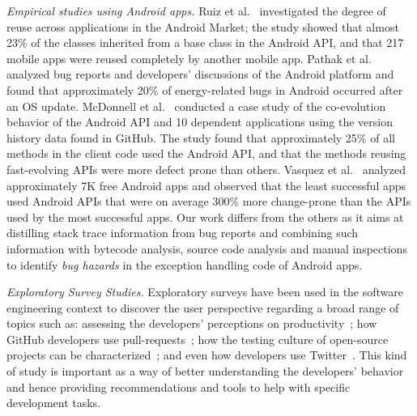 \textit{Empirical studies using Android apps.} Ruiz et al.~\cite{Ruiz12}
investigated the degree of reuse across applications in the Android Market; the
study showed that almost 23\% of the classes inherited from a base class in the
Android API, and that 217 mobile apps were reused completely by another mobile
app. Pathak et al.~\cite{Patha11} analyzed bug reports and developers'
discussions of the Android platform and found that approximately 20\% of
energy-related bugs in Android occurred after an OS update. McDonnell et
al.~\cite{McDon13} conducted a case study of the co-evolution behavior of
the Android API and 10 dependent applications using the version history data found
in GitHub. The study found that approximately 25\% of all methods in the client
code used the Android API, and that the methods reusing fast-evolving APIs were
more defect prone than others. Vasquez et al.~\cite{Linar13} analyzed
approximately 7K free Android apps and observed that the least successful apps
used Android APIs that were on average 300\% more change-prone than the APIs
used by the most successful apps. Our work differs from the others as it aims at
distilling stack trace information from bug reports and combining such information
with bytecode analysis, source code analysis and manual inspections
to identify \emph{bug hazards} in the exception handling code of Android apps.

\textit{Exploratory Survey Studies.} Exploratory surveys have been used in the software
engineering context to discover the user perspective regarding a broad range of
topics such as: assessing the developers' perceptions on productivity~\cite{meyer2014};
how GitHub developers use pull-requests~\cite{gousios2015};
how the testing culture of open-source projects can be characterized~\cite{pham2013};
and even how developers use Twitter~\cite{singer2014}. This kind of study is important as a way of
better understanding the developers' behavior and hence providing recommendations and
tools to help with specific development tasks.

